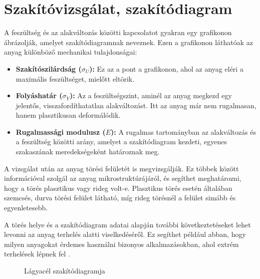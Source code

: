 \documentclass[12pt,a4paper,oneside]{report}
\begin{document}
\section{Szakítóvizsgálat, szakítódiagram}
\noindent A feszültség és az alakváltozás közötti kapcsolatot gyakran egy grafikonon ábrázolják, amelyet szakítódiagramnak neveznek. Ezen a grafikonon láthatóak az anyag különböző mechanikai tulajdonságai:
\begin{itemize}
\item \textbf{Szakítószilárdság ($\sigma_U$):} Ez az a pont a grafikonon, ahol az anyag eléri a maximális feszültséget, mielőtt eltörik.
\item \textbf{Folyáshatár ($\sigma_Y$):} Az a feszültségszint, aminél az anyag megkezd egy jelentős, visszafordíthatatlan alakváltozást. Itt az anyag már nem rugalmasan, hanem plasztikusan deformálódik.
\item \textbf{Rugalmassági modulusz ($E$):} A rugalmas tartományban az alakváltozás és a feszültség közötti arány, amelyet a szakítódiagram kezdeti, egyenes szakaszának meredekségeként határoznak meg.
\end{itemize}

A vizsgálat után az anyag törési felületét is megvizsgálják. Ez többek között információval szolgál az anyag mikrostruktúrájáról, és segíthet meghatározni, hogy a törés plasztikus vagy rideg volt-e. Plasztikus törés esetén általában szemcsés, durva törési felület látható, míg rideg törésnél a felület simább és egyenletesebb.

A törés helye és a szakítódiagram adatai alapján további következtetéseket lehet levonni az anyag terhelés alatti viselkedéséről. Ez segíthet például abban, hogy milyen anyagokat érdemes használni bizonyos alkalmazásokban, ahol extrém terhelések lépnek fel \cite{pek2015anyag,lovas2011anyagismeret}.

\begin{figure}[H]
\begin{center}
\caption{Lágyacél szakítódiagramja}
\label{Fig:Szakdiag}
\end{center}
\end{figure}
\end{document}
